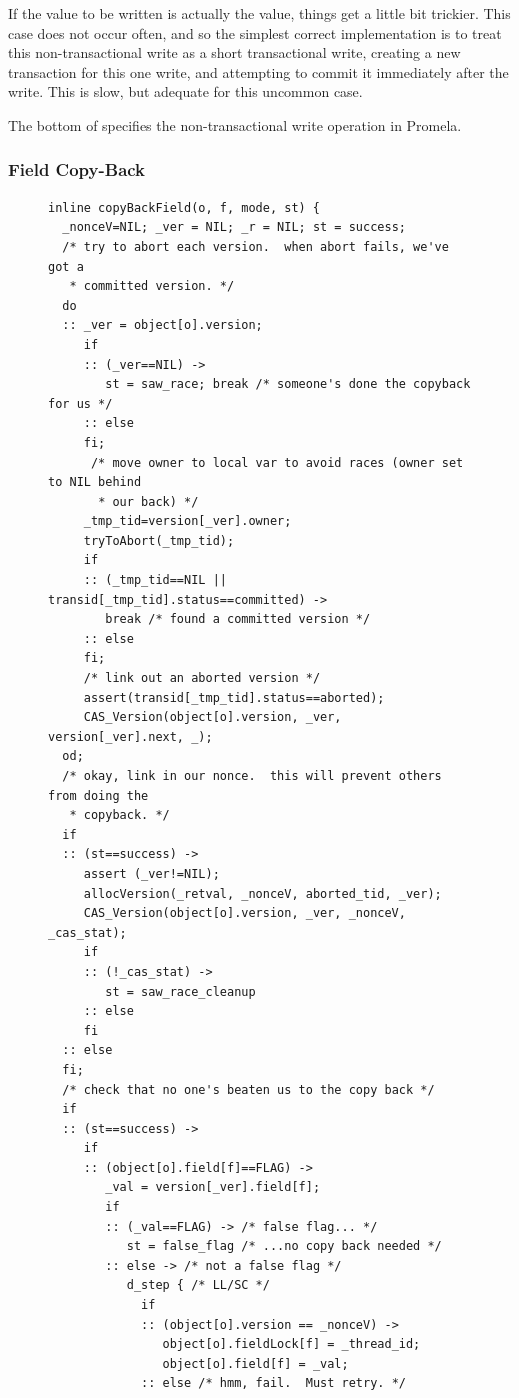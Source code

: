 If the value to be written is actually the \FLAG value, things get a
little bit trickier.  This case does not occur often, and so the
simplest correct implementation is to treat this non-transactional
write as a short transactional write, creating a new transaction for
this one write, and attempting to commit it immediately after the
write.  This is slow, but adequate for this uncommon case.

The bottom of  specifies the non-transactional
write operation in Promela.

\subsubsection{Field Copy-Back}\label{sec:copyback}
\begin{figure}
\sis\fontsize{6.5}{7.4}
\begin{verbatim}
inline copyBackField(o, f, mode, st) {
  _nonceV=NIL; _ver = NIL; _r = NIL; st = success;
  /* try to abort each version.  when abort fails, we've got a
   * committed version. */
  do
  :: _ver = object[o].version;
     if
     :: (_ver==NIL) ->
        st = saw_race; break /* someone's done the copyback for us */
     :: else
     fi;
      /* move owner to local var to avoid races (owner set to NIL behind
       * our back) */
     _tmp_tid=version[_ver].owner;
     tryToAbort(_tmp_tid);
     if
     :: (_tmp_tid==NIL || transid[_tmp_tid].status==committed) ->
        break /* found a committed version */
     :: else
     fi;
     /* link out an aborted version */
     assert(transid[_tmp_tid].status==aborted);
     CAS_Version(object[o].version, _ver, version[_ver].next, _);
  od;
  /* okay, link in our nonce.  this will prevent others from doing the
   * copyback. */
  if
  :: (st==success) ->
     assert (_ver!=NIL);
     allocVersion(_retval, _nonceV, aborted_tid, _ver);
     CAS_Version(object[o].version, _ver, _nonceV, _cas_stat);
     if
     :: (!_cas_stat) ->
        st = saw_race_cleanup
     :: else
     fi
  :: else
  fi;
  /* check that no one's beaten us to the copy back */
  if
  :: (st==success) ->
     if
     :: (object[o].field[f]==FLAG) ->
        _val = version[_ver].field[f];
        if
        :: (_val==FLAG) -> /* false flag... */
           st = false_flag /* ...no copy back needed */
        :: else -> /* not a false flag */
           d_step { /* LL/SC */
             if
             :: (object[o].version == _nonceV) ->
                object[o].fieldLock[f] = _thread_id;
                object[o].field[f] = _val;
             :: else /* hmm, fail.  Must retry. */

\end{verbatim}
\end{figure}
